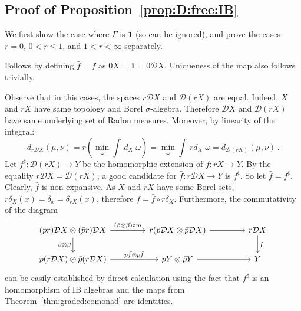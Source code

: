 \documentclass[a4paper,UKenglish,cleveref, autoref, thm-restate]{lipics-v2021}
\newcommand{\mprod}{\otimes}
\newcommand{\unit}{\mathbf{1}}
\newcommand{\D}{\mathcal{D}}
\newcommand{\asmap}{\beta} %
\begin{document}
\subsection{Proof of Proposition~\ref{prop:D:free:IB}}
We first show the case where $\Gamma$ is $\unit$ (so can be ignored), and prove the cases $r=0$, $0 < r \leq 1$, and $1 < r < \infty$ separately.
\begin{description}[wide, font=\sc]
\item[Case $r = 0$:] 
Follows by defining $\bar{f} = f$ as $0 X = \unit = 0 \D X$. Uniqueness of the map also follows trivially.

\item[Case $0 < r \leq 1$:] 
Observe that in this cases, the spaces $r\D X$ and $\D(rX)$ are equal.
Indeed, $X$ and $rX$ have same topology and Borel $\sigma$-algebra. Therefore $\D X$ and $\D (rX)$ have same underlying set of Radon measures. Moreover, by linearity of the integral:
\begin{equation*}
    d_{r\D X}(\mu,\nu) 
    = r \left(\min_{\omega} \int \, d_X \; {\omega}\right)
    = \min_{\omega} \int \, r d_X \; {\omega} 
    = d_{\D(rX)}(\mu,\nu) \,.
\end{equation*}
Let $f^\sharp \colon \D (rX) \to Y$ be the homomorphic extension of $f \colon rX \to Y$. By the equality $r\D X = \D(rX)$, a good candidate for $\bar{f} \colon r\D X \to Y$ is $f^\sharp$. So let $\bar{f} = f^\sharp$. Clearly, $\bar{f}$ is non-expansive. As $X$ and $rX$ have some Borel sets, $r\delta_X(x) = \delta_x = \delta_{rX}(x)$, therefore 
$f = \bar{f} \circ r\delta_X$. Furthermore, the commutativity of the diagram
\[
 \begin{tikzcd}[column sep=10ex]
  (pr)\D X \mprod (\bar pr) \D X \ar{r}{(\asmap\mprod\asmap)\circ m} \arrow[d, "\asmap\mprod\asmap"'] & r(p\D X \mprod \bar p\D X) \ar{r} & r\D X \ar{d}{\bar{f}}  \\
  p(r\D X) \mprod \bar p(r\D X) \ar{r}{p\bar{f} \mprod \bar p \bar{f}} & pY \mprod \bar p Y \ar{r} & Y
 \end{tikzcd}
\] 
can be easily established by direct calculation using the fact that $f^\sharp$ is an homomorphism of IB algebras and the maps from Theorem~\ref{thm:graded:comonad} are identities.


\end{description}
\end{document}
